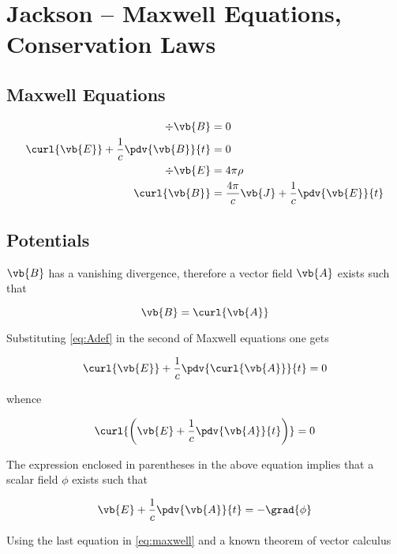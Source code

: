 \chapter{Jackson -- Maxwell Equations, Conservation Laws}
\label{ch:Jackson_06} 

\section{Maxwell Equations}

\begin{equation}
\begin{aligned}
\div{\vb{B}} &= 0\\
\curl{\vb{E}} + \frac{1}{c} \pdv{\vb{B}}{t} &= 0\\
\div{\vb{E}} &= 4 \pi \rho\\
\curl{\vb{B}} &= \frac{4 \pi}{c} \vb{J} + \frac{1}{c} \pdv{\vb{E}}{t}
\end{aligned}
\label{eq:maxwell}
\end{equation}


\section{Potentials}

$\vb{B}$ has a vanishing divergence, therefore a vector field $\vb{A}$ exists such that

\begin{equation}
\vb{B} = \curl{\vb{A}}
\label{eq:Adef}
\end{equation}

Substituting \ref{eq:Adef} in the second of Maxwell equations one gets

\begin{equation*}
\curl{\vb{E}} + \frac{1}{c} \pdv{\curl{\vb{A}}}{t} = 0
\end{equation*}

whence 

\begin{equation}
\curl{ \left( \vb{E} + \frac{1}{c} \pdv{\vb{A}}{t} \right)} = 0
\end{equation}

The expression enclosed in parentheses in the above equation implies that a scalar field $\phi$ exists such that 

\begin{equation}
\vb{E} + \frac{1}{c} \pdv{\vb{A}}{t} = - \grad{\phi}
\label{eq:phidef}
\end{equation}


Using the last equation in \ref{eq:maxwell} and a known theorem of vector calculus

